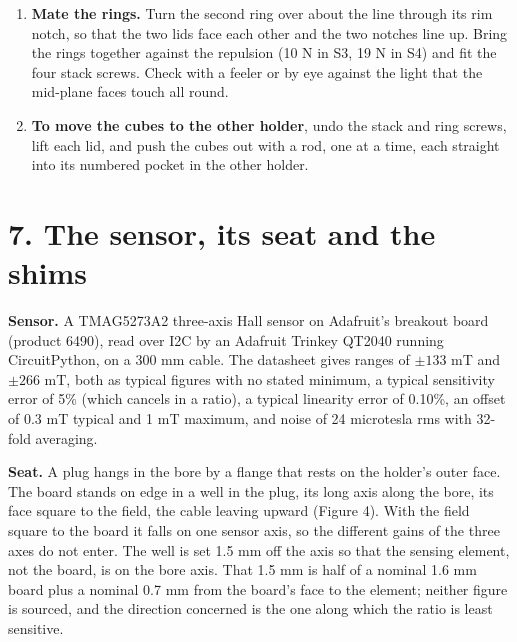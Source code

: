 \documentclass[11pt,a4paper]{article}
\begin{document}
\begin{enumerate}
\item{} {\bfseries\boldmath Mate the rings.} Turn the second ring over about the line through its rim notch, so that the two lids face each other and the two notches line up. Bring the rings together against the repulsion (10 N in S3, 19 N in S4) and fit the four stack screws. Check with a feeler or by eye against the light that the mid-plane faces touch all round.
\item{} {\bfseries\boldmath To move the cubes to the other holder}, undo the stack and ring screws, lift each lid, and push the cubes out with a rod, one at a time, each straight into its numbered pocket in the other holder.
\end{enumerate}


\section*{7. The sensor, its seat and the shims}
{\bfseries\boldmath Sensor.} A TMAG5273A2 three-axis Hall sensor on Adafruit's breakout board (product 6490), read over I2C by an Adafruit Trinkey QT2040 running CircuitPython, on a 300 mm cable. The datasheet gives ranges of $\pm 133$ mT and $\pm 266$ mT, both as typical figures with no stated minimum, a typical sensitivity error of 5\% (which cancels in a ratio), a typical linearity error of 0.10\%, an offset of 0.3 mT typical and 1 mT maximum, and noise of 24 microtesla rms with 32-fold averaging.

{\bfseries\boldmath Seat.} A plug hangs in the bore by a flange that rests on the holder's outer face. The board stands on edge in a well in the plug, its long axis along the bore, its face square to the field, the cable leaving upward (Figure 4). With the field square to the board it falls on one sensor axis, so the different gains of the three axes do not enter. The well is set 1.5 mm off the axis so that the sensing element, not the board, is on the bore axis. That 1.5 mm is half of a nominal 1.6 mm board plus a nominal 0.7 mm from the board's face to the element; neither figure is sourced, and the direction concerned is the one along which the ratio is least sensitive.
\end{document}
